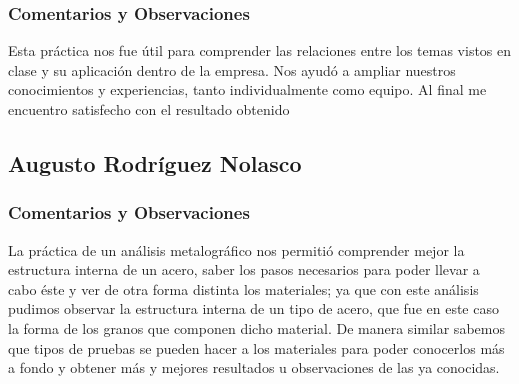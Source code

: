 \subsubsection{Comentarios y Observaciones}
Esta pr\'actica nos fue útil para comprender las relaciones entre los temas vistos en
clase y su aplicaci\'on dentro de la empresa. Nos ayud\'o a ampliar nuestros conocimientos
y experiencias, tanto individualmente como equipo. Al final me encuentro satisfecho con
el resultado obtenido

\subsection{Augusto Rodr\'iguez Nolasco}
\subsubsection{Comentarios y Observaciones}
La pr\'actica de un análisis metalográfico nos permitió comprender mejor la estructura interna
de un acero, saber los pasos necesarios para poder llevar a cabo éste y ver de otra forma distinta
los materiales; ya que con este análisis pudimos observar la estructura interna de un tipo de acero,
que fue en este caso la forma de los granos que componen dicho material. De manera similar sabemos
que tipos de pruebas se pueden hacer a los materiales para poder conocerlos más a fondo y obtener más
y mejores resultados u observaciones de las ya conocidas.